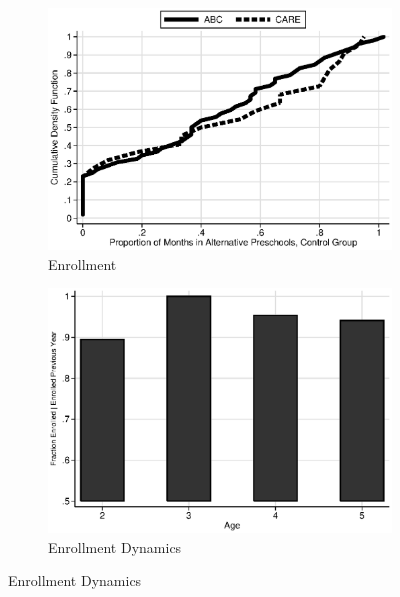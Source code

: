 \begin{figure}
\centering
\caption{Control Substitution Characteristics, ABC/CARE Control Group}\label{fig:control-sub}
\begin{subfigure}[h]{0.4\textwidth}
		\centering
		\caption{Enrollment} \label{fig:treatsubcare}
		\includegraphics[width=\textwidth]{output/abccare_controlcontamination.eps}
\end{subfigure}%
\begin{subfigure}[h]{0.4\textwidth}
		\centering
		\caption{Enrollment Dynamics} \label{fig:treatsubcare_2}
		\includegraphics[width=\textwidth]{output/abccare_Vprobs.eps}
\end{subfigure}


\end{figure}

